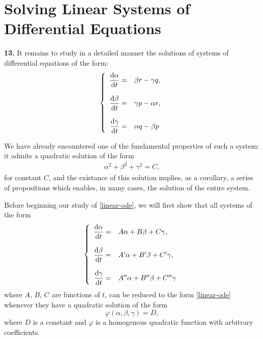 \chapter{Solving Linear Systems of Differential Equations}
\label{chp2}

\textbf{13.} It remains to study in a detailed manner the solutions of systems of differential
equations of the form:
\begin{align}
  \left\{\begin{array}{rl}
    \displaystyle \frac{\operatorname{d}\!{\alpha}}{\operatorname{d}\!{t}}  =& \beta  r - \gamma q, \\\\
    \displaystyle \frac{\operatorname{d}\!{\beta}}{\operatorname{d}\!{t}}   =& \gamma p - \alpha r, \\\\
    \displaystyle \frac{\operatorname{d}\!{\gamma}}{\operatorname{d}\!{t}}  =& \alpha q - \beta p
  \end{array}\right. \label{linear-ode}
\end{align}

We have already encountered one of the fundamental properties of such a system: it admits a
quadratic solution of the form
\begin{align}
  \alpha^2 + \beta^2 + \gamma^2 = C,
\end{align}
for constant $C$, and the existance of this solution implies, as a corollary, a series of
propositions which enables, in many cases, the solution of the entire system.

Before beginning our study of \eqref{linear-ode}, we will first show that all systems of the form
\begin{align}
  \left\{\begin{array}{rl}
    \displaystyle \frac{\operatorname{d}\!{\alpha}}{\operatorname{d}\!{t}} =& A\alpha + B\beta + C\gamma, \\\\
    \displaystyle \frac{\operatorname{d}\!{\beta}}{\operatorname{d}\!{t}}  =& A'\alpha + B'\beta + C'\gamma, \\\\
    \displaystyle \frac{\operatorname{d}\!{\gamma}}{\operatorname{d}\!{t}} =& A''\alpha + B''\beta + C''\gamma
  \end{array}\right.
\end{align}
where $A$, $B$, $C$ are functions of $t$, can be reduced to the form \eqref{linear-ode} whenever
they have a quadratic solution of the form
\[
\varphi(\alpha, \beta, \gamma) = D,
\]
where $D$ is a constant and $\varphi$ is a homogenous quadratic function with arbitrary coefficients.
